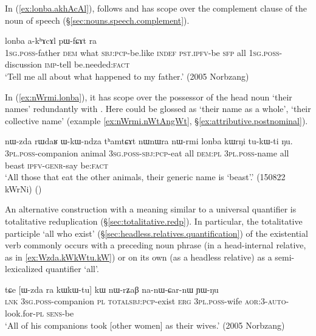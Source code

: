 In (\ref{ex:lonba.akhAcAl}),  follows and has scope over the complement clause of the noun of speech  (§\ref{sec:nouns.speech.complement}).

\begin{exe}
\ex \label{ex:lonba.akhAcAl}
  lonba a-kʰɤcɤl pɯ-fɕɤt ra \\
 \textsc{1sg}.\textsc{poss}-father \textsc{dem} what \textsc{sbj}:\textsc{pcp}-be.like \textsc{indef} \textsc{pst}.\textsc{ipfv}-be \textsc{sfp} all \textsc{1sg}.\textsc{poss}-discussion \textsc{imp}-tell be.needed:\textsc{fact} \\
\glt `Tell me all about what happened to my father.' (2005 Norbzang)
\end{exe}

In (\ref{ex:nWrmi.lonba}), it has scope over the possessor of the head noun  `their names' redundantly with . Here  could be glossed as  `their name as a whole', `their collective name' (example \ref{ex:nWrmi.nWtAngWt}, §\ref{ex:attributive.postnominal}).

\begin{exe}
\ex \label{ex:nWrmi.lonba}
\gll nɯ-zda rɯdaʁ ɯ-kɯ-ndza tʰamtɕɤt nɯnɯra nɯ-rmi lonba kɯrŋi tu-kɯ-ti ŋu. \\
\textsc{3pl}.\textsc{poss}-companion animal \textsc{3sg}.\textsc{poss}-\textsc{sbj}:\textsc{pcp}-eat all \textsc{dem}:\textsc{pl} \textsc{3pl}.\textsc{poss}-name all beast \textsc{ipfv}-\textsc{genr}-say be:\textsc{fact} \\ 
 \glt `All those that eat the other animals, their generic name is `beast'.'  (150822 kWrNi)
()
\end{exe}
 
An alternative construction with a meaning similar to a universal quantifier is totalitative reduplication (§\ref{sec:totalitative.redp}). In particular, the totalitative participle  `all who exist' (§\ref{sec:headless.relatives.quantification}) of the existential verb  commonly occurs with a preceding noun phrase (in a head-internal relative, as in \ref{ex:Wzda.kWkWtu.kW}) or on its own (as a headless relative) as a semi-lexicalized quantifier `all'. 

\begin{exe}
\ex \label{ex:Wzda.kWkWtu.kW}
\gll tɕe [ɯ-zda ra kɯ\redp{}kɯ-tu] kɯ nɯ-rʑaβ na-nɯ-ɕar-nɯ ɲɯ-ŋu \\
\textsc{lnk} \textsc{3sg}.\textsc{poss}-companion \textsc{pl} \textsc{total}\redp{}\textsc{sbj}:\textsc{pcp}-exist \textsc{erg} \textsc{3pl}.\textsc{poss}-wife \textsc{aor}:3\flobv{}-\textsc{auto}-look.for-\textsc{pl} \textsc{sens}-be \\
\glt `All of his companions took [other women] as their wives.' (2005 Norbzang)
\end{exe}
  
